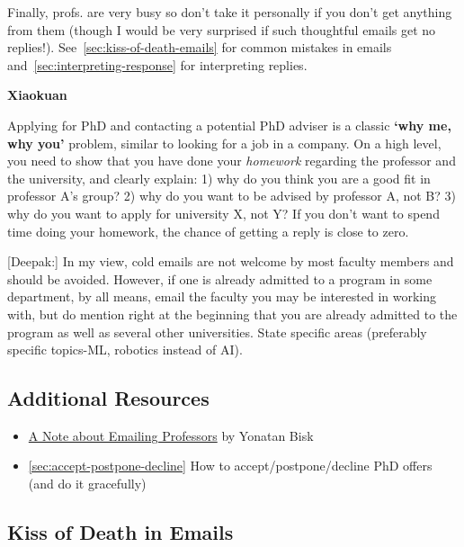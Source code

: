 \documentclass[oneside,11pt,dvipsnames]{book}
\newenvironment{commentbox}[1][]{
  \small
  \begin{mybox}
    {\small \textbf{#1}}
  }{
  \end{mybox}
}
\begin{document}
Finally, profs. are very busy so don't take it personally if you don't get anything from them (though I would be very surprised if such thoughtful emails get no replies!).
See~\autoref{sec:kiss-of-death-emails} for common mistakes in emails and~\autoref{sec:interpreting-response} for interpreting replies.

\begin{commentbox}[Xiaokuan]
  Applying for PhD and contacting a potential PhD adviser is a classic \textbf{`why me, why you'} problem,
  similar to looking for a job in a company.
  On a high level,
  you need to show that you have done your \emph{homework}
  regarding the professor and the university,
  and clearly explain:
  1) why do you think you are a good fit in professor A's group?
  2) why do you want to be advised by professor A, not B?
  3) why do you want to apply for university X, not Y?
  If you don't want to spend time doing your homework,
  the chance of getting a reply is close to zero.
\end{commentbox}


\begin{commentbox}
  [Deepak:]
  In my view, cold emails are not welcome by most faculty members and should be avoided. However, if one is already admitted to a program in some department, by all means, email the faculty you may be interested in working with, but do mention right at the beginning that you are already admitted to the program as well as several other universities. State specific areas (preferably specific topics-ML, robotics instead of AI).
\end{commentbox}


\subsection*{Additional Resources}
\begin{itemize}
  \item \href{https://yonatanbisk.com/emailing_professors.html}{A Note about Emailing Professors} by Yonatan Bisk
  \item \autoref{sec:accept-postpone-decline} How to accept/postpone/decline PhD offers (and do it gracefully)
\end{itemize}


\subsection{Kiss of Death in Emails}\label{sec:kiss-of-death-emails}
\end{document}

